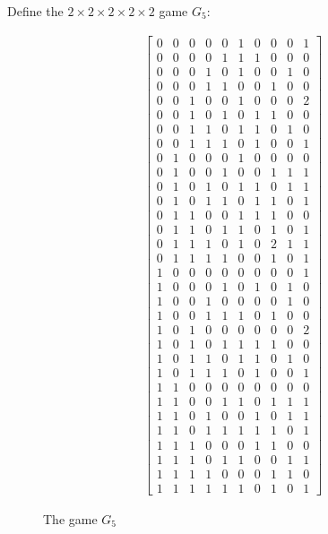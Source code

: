 \documentclass[preprint,12pt,authoryear]{elsarticle}
\begin{document}
Define the $2\times2\times2\times2\times2$ game $G_5$:
\begin{figure}[H]
\centering
\begin{align*}
  \left[\begin{array}{ccccc|ccccc}
    0&0&0&0&0&1&0&0&0&1\\
    0&0&0&0&1&1&1&0&0&0\\
    0&0&0&1&0&1&0&0&1&0\\
    0&0&0&1&1&0&0&1&0&0\\
    0&0&1&0&0&1&0&0&0&2\\
    0&0&1&0&1&0&1&1&0&0\\
    0&0&1&1&0&1&1&0&1&0\\
    0&0&1&1&1&0&1&0&0&1\\
    0&1&0&0&0&1&0&0&0&0\\
    0&1&0&0&1&0&0&1&1&1\\
    0&1&0&1&0&1&1&0&1&1\\
    0&1&0&1&1&0&1&1&0&1\\
    0&1&1&0&0&1&1&1&0&0\\
    0&1&1&0&1&1&0&1&0&1\\
    0&1&1&1&0&1&0&2&1&1\\
    0&1&1&1&1&0&0&1&0&1\\
    1&0&0&0&0&0&0&0&0&1\\
    1&0&0&0&1&0&1&0&1&0\\
    1&0&0&1&0&0&0&0&1&0\\
    1&0&0&1&1&1&0&1&0&0\\
    1&0&1&0&0&0&0&0&0&2\\
    1&0&1&0&1&1&1&1&0&0\\
    1&0&1&1&0&1&1&0&1&0\\
    1&0&1&1&1&0&1&0&0&1\\
    1&1&0&0&0&0&0&0&0&0\\
    1&1&0&0&1&1&0&1&1&1\\
    1&1&0&1&0&0&1&0&1&1\\
    1&1&0&1&1&1&1&1&0&1\\
    1&1&1&0&0&0&1&1&0&0\\
    1&1&1&0&1&1&0&0&1&1\\
    1&1&1&1&0&0&0&1&1&0\\
    1&1&1&1&1&1&0&1&0&1
  \end{array}\right]
\end{align*}
\caption{The game $G_5$}
\label{fig:G5}
\end{figure}
\end{document}
